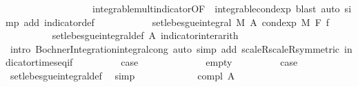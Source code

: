 \begin{isabellebody}
\ \ \ \ \ \ \ \ \ \ \ \ \ \ \ \ \ \ integrable{\isacharunderscore}{\kern0pt}mult{\isacharunderscore}{\kern0pt}indicator{\isacharbrackleft}{\kern0pt}OF\ {\isacharunderscore}{\kern0pt}\ integrable{\isacharunderscore}{\kern0pt}cond{\isacharunderscore}{\kern0pt}exp{\isacharbrackright}{\kern0pt}{\isacharcomma}{\kern0pt}\ blast{\isacharparenright}{\kern0pt}\ {\isacharparenleft}{\kern0pt}auto\ simp\ add{\isacharcolon}{\kern0pt}\ indicator{\isacharunderscore}{\kern0pt}def{\isacharparenright}{\kern0pt}\isanewline
\ \ \ \ \ \ \isamarkupfalse%
\ \isamarkupfalse%
\ {\isachardoublequoteopen}{\isachardot}{\kern0pt}{\isachardot}{\kern0pt}{\isachardot}{\kern0pt}\ {\isacharequal}{\kern0pt}\ set{\isacharunderscore}{\kern0pt}lebesgue{\isacharunderscore}{\kern0pt}integral\ M\ A\ {\isacharparenleft}{\kern0pt}cond{\isacharunderscore}{\kern0pt}exp\ M\ F\ f{\isacharparenright}{\kern0pt}{\isachardoublequoteclose}\ \isanewline
\ \ \ \ \ \ \ \ \isamarkupfalse%
\ set{\isacharunderscore}{\kern0pt}lebesgue{\isacharunderscore}{\kern0pt}integral{\isacharunderscore}{\kern0pt}def\ A\ indicator{\isacharunderscore}{\kern0pt}inter{\isacharunderscore}{\kern0pt}arith\ \isanewline
\ \ \ \ \ \ \ \ \isamarkupfalse%
\ {\isacharparenleft}{\kern0pt}intro\ Bochner{\isacharunderscore}{\kern0pt}Integration{\isachardot}{\kern0pt}integral{\isacharunderscore}{\kern0pt}cong{\isacharcomma}{\kern0pt}\ auto\ simp\ add{\isacharcolon}{\kern0pt}\ scaleR{\isacharunderscore}{\kern0pt}scaleR{\isacharbrackleft}{\kern0pt}symmetric{\isacharbrackright}{\kern0pt}\ indicator{\isacharunderscore}{\kern0pt}times{\isacharunderscore}{\kern0pt}eq{\isacharunderscore}{\kern0pt}if{\isacharparenleft}{\kern0pt}{}{\isacharparenright}{\kern0pt}{\isacharparenright}{\kern0pt}\isanewline
\ \ \ \ \ \ \isamarkupfalse%
\ \isamarkupfalse%
\ {\isacharquery}{\kern0pt}case\ \isacommand{{\isachardot}{\kern0pt}}\isamarkupfalse%
\isanewline
\ \ \ \ \isamarkupfalse%
\isanewline
\ \ \ \ \ \ \isamarkupfalse%
\ empty\isanewline
\ \ \ \ \ \ \isamarkupfalse%
\ \isamarkupfalse%
\ {\isacharquery}{\kern0pt}case\ \isamarkupfalse%
\ set{\isacharunderscore}{\kern0pt}lebesgue{\isacharunderscore}{\kern0pt}integral{\isacharunderscore}{\kern0pt}def\ \isamarkupfalse%
\ simp\isanewline
\ \ \ \ \isamarkupfalse%
\isanewline
\ \ \ \ \ \ \isamarkupfalse%
\ {\isacharparenleft}{\kern0pt}compl\ A{\isacharparenright}{\kern0pt}\isanewline

\end{isabellebody}
